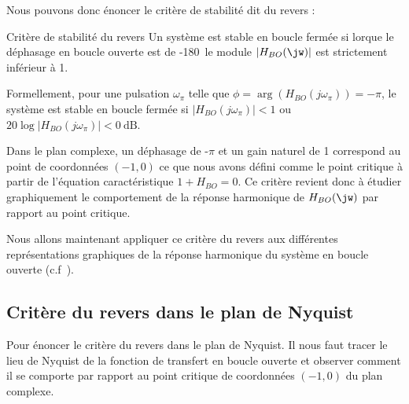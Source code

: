 Nous pouvons donc énoncer le critère de stabilité dit du revers :
\begin{criteria}{Critère de stabilité du revers}
    Un système est stable en boucle fermée si lorque le 
    déphasage en boucle ouverte est de -180\degreeSI~le module $|H_{BO}(\jw)|$ 
    est strictement inférieur à 1.
\end{criteria}
Formellement, pour une pulsation $\omega_{\pi}$ telle que 
$\phi=\arg{\left(H_{BO}(j\omega_\pi)\right)}=-\pi$, 
le système est stable en boucle fermée si $|H_{BO}(j\omega_\pi)|<1$ ou 
$20\log{|H_{BO}(j\omega_\pi)|}<\SI{0}{\dB}$.

Dans le plan complexe, un  déphasage de -$\pi$ et un gain naturel de 1 
correspond au point de coordonnées $(-1,0)$ ce que nous avons défini comme 
le point critique à partir de l'équation caractéristique $1+H_{BO}=0$. 
Ce critère revient donc à étudier graphiquement le comportement 
de la réponse harmonique de $H_{BO}(\jw)$ par rapport au point critique.

Nous allons maintenant appliquer ce 
critère du revers aux différentes représentations graphiques de la 
réponse harmonique du système en boucle ouverte (c.f~).
\clearpage
\subsection{Critère du revers dans le plan de Nyquist
}
Pour énoncer le critère du revers dans le plan de Nyquist. Il nous faut tracer
le lieu de Nyquist de la fonction de transfert en boucle ouverte et observer 
comment il se comporte par rapport au point critique de coordonnées $(-1,0)$ 
du plan complexe. 

